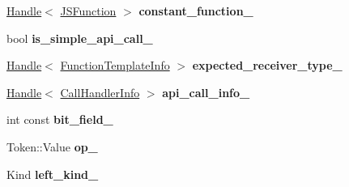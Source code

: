 \begin{DoxyCompactItemize}
\item 
\hyperlink{classv8_1_1internal_1_1_handle}{Handle}$<$ \hyperlink{classv8_1_1internal_1_1_j_s_function}{J\+S\+Function} $>$ {\bfseries constant\+\_\+function\+\_\+}\hypertarget{classv8_1_1internal_1_1_b_a_s_e___e_m_b_e_d_d_e_d_ab78f744c1c06e91f7b82d90b2be293fc}{}\label{classv8_1_1internal_1_1_b_a_s_e___e_m_b_e_d_d_e_d_ab78f744c1c06e91f7b82d90b2be293fc}

\item 
bool {\bfseries is\+\_\+simple\+\_\+api\+\_\+call\+\_\+}\hypertarget{classv8_1_1internal_1_1_b_a_s_e___e_m_b_e_d_d_e_d_a0b8a17cca4d4c4439ea97ea53eab0a5f}{}\label{classv8_1_1internal_1_1_b_a_s_e___e_m_b_e_d_d_e_d_a0b8a17cca4d4c4439ea97ea53eab0a5f}

\item 
\hyperlink{classv8_1_1internal_1_1_handle}{Handle}$<$ \hyperlink{classv8_1_1internal_1_1_function_template_info}{Function\+Template\+Info} $>$ {\bfseries expected\+\_\+receiver\+\_\+type\+\_\+}\hypertarget{classv8_1_1internal_1_1_b_a_s_e___e_m_b_e_d_d_e_d_a05490bb29242f01fca53cf26b859833b}{}\label{classv8_1_1internal_1_1_b_a_s_e___e_m_b_e_d_d_e_d_a05490bb29242f01fca53cf26b859833b}

\item 
\hyperlink{classv8_1_1internal_1_1_handle}{Handle}$<$ \hyperlink{classv8_1_1internal_1_1_call_handler_info}{Call\+Handler\+Info} $>$ {\bfseries api\+\_\+call\+\_\+info\+\_\+}\hypertarget{classv8_1_1internal_1_1_b_a_s_e___e_m_b_e_d_d_e_d_ac44d37a12eeec37e0e0bf97180a20355}{}\label{classv8_1_1internal_1_1_b_a_s_e___e_m_b_e_d_d_e_d_ac44d37a12eeec37e0e0bf97180a20355}

\item 
int const {\bfseries bit\+\_\+field\+\_\+}\hypertarget{classv8_1_1internal_1_1_b_a_s_e___e_m_b_e_d_d_e_d_a0c2f9779188e85cf7855d7d66c2a5ec0}{}\label{classv8_1_1internal_1_1_b_a_s_e___e_m_b_e_d_d_e_d_a0c2f9779188e85cf7855d7d66c2a5ec0}

\item 
Token\+::\+Value {\bfseries op\+\_\+}\hypertarget{classv8_1_1internal_1_1_b_a_s_e___e_m_b_e_d_d_e_d_a222877525c4a47499d08119eade7be7a}{}\label{classv8_1_1internal_1_1_b_a_s_e___e_m_b_e_d_d_e_d_a222877525c4a47499d08119eade7be7a}

\item 
Kind {\bfseries left\+\_\+kind\+\_\+}\hypertarget{classv8_1_1internal_1_1_b_a_s_e___e_m_b_e_d_d_e_d_a0b1b35f6ffa46e8cad45e942f8634ecd}{}\label{classv8_1_1internal_1_1_b_a_s_e___e_m_b_e_d_d_e_d_a0b1b35f6ffa46e8cad45e942f8634ecd}


\end{DoxyCompactItemize}

